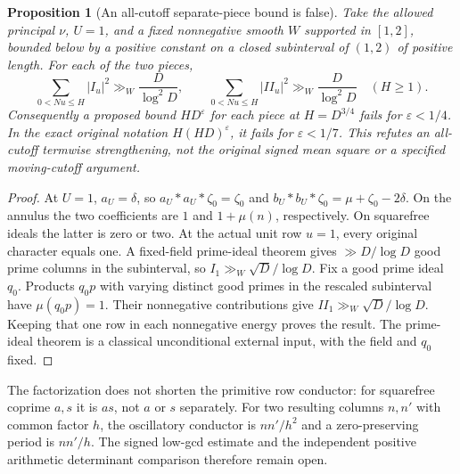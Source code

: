 \documentclass[11pt]{article}
\newtheorem{proposition}[theorem]{Proposition}
\theoremstyle{definition}\newtheorem{definition}[theorem]{Definition}
\theoremstyle{remark}\newtheorem{remark}[theorem]{Remark}
\begin{document}
\begin{proposition}[An all-cutoff separate-piece bound is false]
\label{prop:mobius-unit-cutoff}
Take the allowed principal $\nu$, $U=1$, and a fixed nonnegative smooth
$W$ supported in $[1,2]$, bounded below by a positive constant on a closed
subinterval of $(1,2)$ of positive length.
For each of the two pieces,
\[
 \sum_{0<Nu\le H}|I_u|^2\gg_W\frac{D}{\log^2D},\qquad
 \sum_{0<Nu\le H}|II_u|^2\gg_W\frac{D}{\log^2D}
 \quad(H\ge1).
\]
Consequently a proposed bound $H D^\varepsilon$ for each piece at
$H=D^{3/4}$ fails for $\varepsilon<1/4$. In the exact original notation
$H(HD)^\varepsilon$, it fails for $\varepsilon<1/7$.
This refutes an all-cutoff termwise strengthening, not the original signed
mean square or a specified moving-cutoff argument.
\end{proposition}
\begin{proof}
At $U=1$, $a_U=\delta$, so $a_U*a_U*\zeta_0=\zeta_0$ and
$b_U*b_U*\zeta_0=\mu+\zeta_0-2\delta$.
On the annulus the two coefficients are $1$ and $1+\mu(n)$, respectively.
On squarefree ideals the latter is zero or two. At the actual unit row
$u=1$, every original character equals one. A fixed-field prime-ideal
theorem gives $\gg D/\log D$ good prime columns in the subinterval,
so $I_1\gg_W\sqrt D/\log D$. Fix a good prime ideal $q_0$.
Products $q_0p$ with varying distinct good primes in the rescaled
subinterval have $\mu(q_0p)=1$. Their nonnegative contributions give
$II_1\gg_W\sqrt D/\log D$. Keeping that one row in each nonnegative
energy proves the result. The prime-ideal theorem is a classical
unconditional external input, with the field and $q_0$ fixed.
\end{proof}

The factorization does not shorten the primitive row conductor:
for squarefree coprime $a,s$ it is $as$, not $a$ or $s$ separately.
For two resulting columns $n,n'$ with common factor $h$, the oscillatory
conductor is $nn'/h^2$ and a zero-preserving period is $nn'/h$.
The signed low-gcd estimate and the independent positive arithmetic
determinant comparison therefore remain open.
\end{document}
